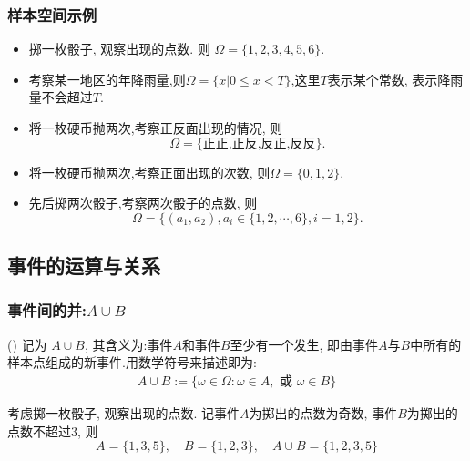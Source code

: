 \begin{frame}
  \frametitle{样本空间示例}
  \begin{itemize}[<+-|alert@+>]
  \item 掷一枚骰子, 观察出现的点数. 则 $\Omega=\{1, 2, 3, 4, 5, 6\}$.
  \item 考察某一地区的年降雨量,则$\Omega=\{x|0\le x<T\}$,这里$T$表示某个常数, 表示降雨量不会超过$T$.
  \item 将一枚硬币抛两次,考察正反面出现的情况, 则 \[\Omega=\{\mbox{正正,正反,反正,反反}\}.\]
  \item 将一枚硬币抛两次,考察正面出现的次数, 则$\Omega=\{0, 1, 2\}$.
  \item 先后掷两次骰子,考察两次骰子的点数, 则
  $$\Omega=\{(a_1, a_2), a_i\in \{1,2,\cdots, 6\}, i=1,2\}.$$
  \end{itemize}
\end{frame}
\subsection{事件的运算与关系}
\begin{frame}
  \frametitle{事件间的并:$A\cup B$}

  \begin{defi} () 记为 $A\cup B$, 其含义为:事件$A$和事件$B$至少有一个发生, 即由事件$A$与$B$中所有的样本点组成的新事件.\pause 用数学符号来描述即为:
    \begin{eqnarray*}
      A\cup B:=\{\omega\in \Omega: \omega\in A, \mbox{ 或 } \omega\in B\}
    \end{eqnarray*}
  \end{defi}
  \vspace{-0.7cm}

  \pause
  \begin{exam}
    考虑掷一枚骰子, 观察出现的点数. 记事件$A$为掷出的点数为奇数, 事件$B$为掷出的点数不超过$3$, 则
    \[A=\{1,3,5\},\quad  B=\{1,2,3\},\quad  A\cup B=\{1,2,3,5\}\]

  \end{exam}


\end{frame}

